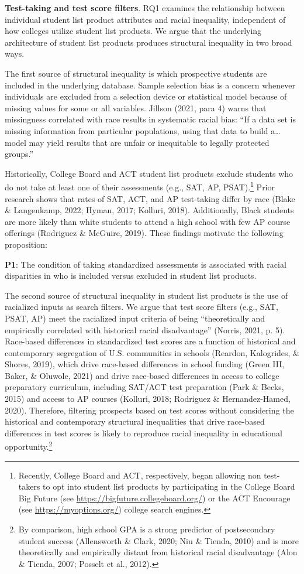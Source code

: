 \documentclass[
  12pt,
]{article}
\begin{document}
\textbf{Test-taking and test score filters}. RQ1 examines the relationship between individual student list product attributes and racial inequality, independent of how colleges utilize student list products. We argue that the underlying architecture of student list products produces structural inequality in two broad ways.

The first source of structural inequality is which prospective students are included in the underlying database. Sample selection bias is a concern whenever individuals are excluded from a selection device or statistical model because of missing values for some or all variables. Jillson (2021, para 4) warns that missingness correlated with race results in systematic racial bias: ``If a data set is missing information from particular populations, using that data to build a\ldots model may yield results that are unfair or inequitable to legally protected groups.''

Historically, College Board and ACT student list products exclude students who do not take at least one of their assessments (e.g., SAT, AP, PSAT).\footnote{Recently, College Board and ACT, respectively, began allowing non test-takers to opt into student list products by participating in the College Board Big Future (see \url{https://bigfuture.collegeboard.org/}) or the ACT Encourage (see \url{https://myoptions.org/}) college search engines.} Prior research shows that rates of SAT, ACT, and AP test-taking differ by race (Blake \& Langenkamp, 2022; Hyman, 2017; Kolluri, 2018). Additionally, Black students are more likely than white students to attend a high school with few AP course offerings (Rodriguez \& McGuire, 2019). These findings motivate the following proposition:

\textbf{P1}: The condition of taking standardized assessments is associated with racial disparities in who is included versus excluded in student list products.

The second source of structural inequality in student list products is the use of racialized inputs as search filters. We argue that test score filters (e.g., SAT, PSAT, AP) meet the racialized input criteria of being ``theoretically and empirically correlated with historical racial disadvantage'' (Norris, 2021, p. 5). Race-based differences in standardized test scores are a function of historical and contemporary segregation of U.S. communities in schools (Reardon, Kalogrides, \& Shores, 2019), which drive race-based differences in school funding (Green III, Baker, \& Oluwole, 2021) and drive race-based differences in access to college preparatory curriculum, including SAT/ACT test preparation (Park \& Becks, 2015) and access to AP courses (Kolluri, 2018; Rodriguez \& Hernandez-Hamed, 2020). Therefore, filtering prospects based on test scores without considering the historical and contemporary structural inequalities that drive race-based differences in test scores is likely to reproduce racial inequality in educational opportunity.\footnote{By comparison, high school GPA is a strong predictor of postsecondary student success (Allensworth \& Clark, 2020; Niu \& Tienda, 2010) and is more theoretically and empirically distant from historical racial disadvantage (Alon \& Tienda, 2007; Posselt et al., 2012).}
\end{document}
